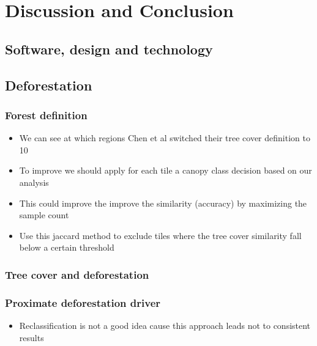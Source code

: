 \chapter{Discussion and Conclusion}
\label{ch:discussion}

	\section{Software, design and technology}

	\section{Deforestation}
	\label{sec:discussion_deforestation}

		\subsection{Forest definition}
		\label{subsec:discussion_forest_definition}
			\begin{itemize}
				\item We can see at which regions Chen et al switched their tree cover definition to 10
				\item To improve we should apply for each tile a canopy class decision based on our analysis
				\item This could improve the improve the similarity (accuracy) by maximizing the sample count
				\item Use this jaccard method to exclude tiles where the tree cover similarity fall below a certain threshold
			\end{itemize}

		\subsection{Tree cover and deforestation}
		\label{subsec:discussion_tree_cover_and_deforestation}

		\subsection{Proximate deforestation driver}
		\label{subsec:discussion_proxy_deforestation_driver}
			\begin{itemize}
				\item Reclassification is not a good idea cause this approach leads not to consistent results
			\end{itemize}

